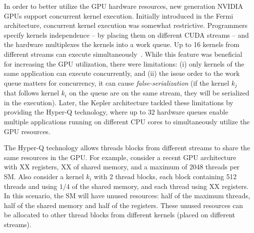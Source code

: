 \documentclass[conference]{IEEEtran}
\begin{document}
In order to better utilize the GPU hardware resources, new generation NVIDIA GPUs support concurrent kernel execution.  Initially introduced in the Fermi architecture, concurrent kernel execution was somewhat restrictive. Programmers specify kernels independence -- by placing them on different CUDA streams -- and the hardware multiplexes the kernels into a work queue. Up to 16 kernels from different streams can execute simultaneously~\cite{FermiArch:2010}. While this feature was beneficial for increasing the GPU utilization, there were limitations: (i) only  kernels of the same application can execute concurrently, and (ii) the issue order to the work queue matters for concurrency, it can cause \textit{false-serialization} (if the kernel $k_j$ that follows kernel $k_i$ on the queue are on the same stream, they will be serialized in the execution). Later, the Kepler architecture tackled these limitations by providing the Hyper-Q technology, where up to 32 hardware queues enable multiple applications running on different CPU cores to simultaneously utilize the GPU resources.

The Hyper-Q technology allows threads blocks from different streams to share the same resources in the GPU. For example, consider a recent GPU architecture with XX registers, XX of shared memory, and a maximum of 2048 threads per SM. Also consider a kernel $k_i$ with 2 thread blocks, each block containing 512 threads and using $1/4$ of the shared memory, and each thread using XX registers. In this scenario, the SM will have unused resources: half of the maximum threads, half of the shared memory and half of the registers. These unused resources can be allocated to other thread blocks from different kernels (placed on different streams).
\end{document}
